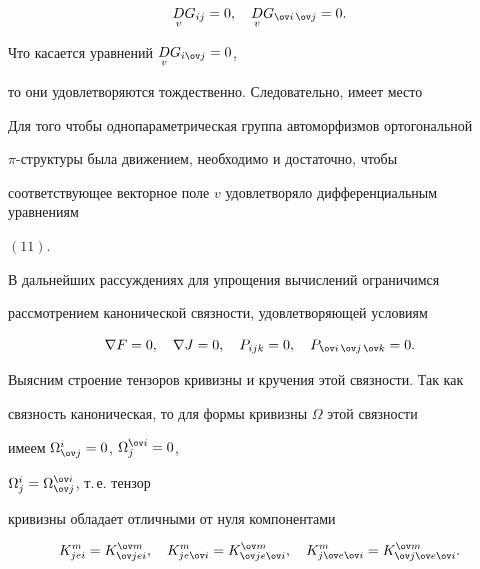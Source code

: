 \begin{equation}


\down{v}{D}G_{ij}=0,\quad \down{v}{D}G_{\ov i\,\ov j}=0.


\end{equation}


Что касается уравнений $\down{v}{D}G_{i\ov j}=0$,


то они удовлетворяются тождественно. Следовательно, имеет место





\begin{thm}


Для того чтобы однопараметрическая группа автоморфизмов ортогональной


$\pi$-структуры была движением, необходимо и достаточно, чтобы


соответствующее векторное поле $v$ удовлетворяло дифференциальным уравнениям


$(11)$.


\end{thm}





В дальнейших рассуждениях для упрощения вычислений ограничимся


рассмотрением канонической связности, удовлетворяющей условиям \cite{3}


$$


\nabla F=0,\quad \nabla J=0,\quad P_{ijk}=0,\quad


P_{\ov i\,\ov j\,\ov k}=0.


$$


Выясним строение тензоров кривизны и кручения этой связности. Так как


связность каноническая, то для формы кривизны $\Omega$ этой связности


имеем $\Omega^i_{\ov j}=0$, $\Omega^{\ov i}_j=0$,


$\Omega^i_j=\Omega^{\ov i}_{\ov j}$, т.\,е. тензор


кривизны обладает отличными от нуля компонентами


\begin{equation}


K^m_{jei}=K^{\ov m}_{\ov j ei},\quad


K^m_{je\ov i}=K^{\ov m}_{\ov j e\ov i},\quad


K^m_{j\ov e\ov i}=K^{\ov m}_{\ov j\ov e\ov i}.


\end{equation}



